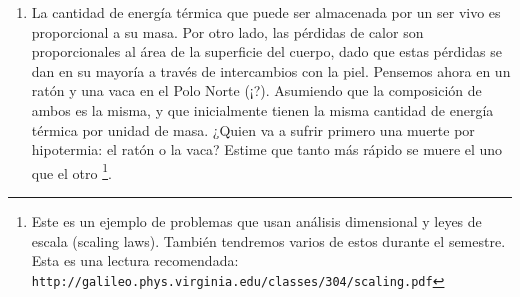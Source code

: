\documentclass{article}
\begin{document}
\begin{enumerate}
\item{La cantidad de energ\'ia
  t\'ermica que puede ser almacenada por un ser vivo es proporcional a su
  masa. Por otro lado, las p\'erdidas de calor son proporcionales al
  área de la superficie del cuerpo, dado que estas p\'erdidas se dan en su
  mayor\'ia a trav\'es de intercambios con la piel. Pensemos ahora en
  un rat\'on y una vaca en el Polo Norte (¡?). Asumiendo que la
  composici\'on de ambos es la misma, y que inicialmente tienen la
  misma cantidad de energ\'ia t\'ermica por 
  unidad de masa. ¿Quien va a sufrir primero una muerte por hipotermia:
  el rat\'on o la vaca? Estime que tanto m\'as r\'apido se
  muere el uno que el otro \footnote{Este es un ejemplo de problemas que
    usan an\'alisis dimensional y leyes de escala (scaling laws). Tambi\'en
    tendremos varios de estos durante el semestre. Esta es una lectura
recomendada: {\texttt{http://galileo.phys.virginia.edu/classes/304/scaling.pdf}}}.} 
\end{enumerate}
\end{document}
